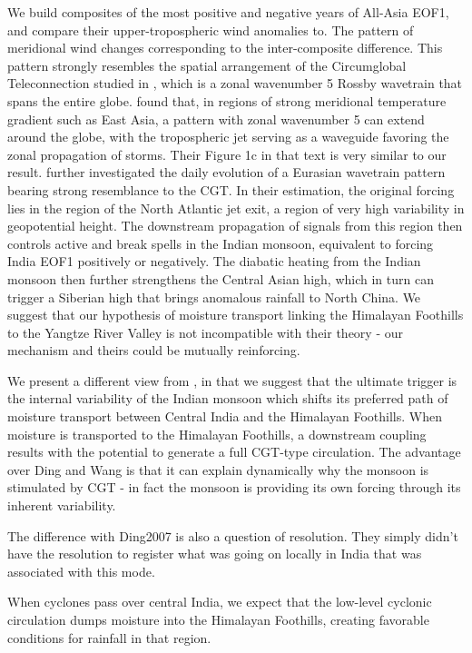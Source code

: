 	We build composites of the most positive and negative years of All-Asia EOF1, and compare their upper-tropospheric wind anomalies to. The pattern of meridional wind changes corresponding to the inter-composite difference. This pattern strongly resembles the spatial arrangement of the Circumglobal Teleconnection studied in \citet{Ding2005a}, which is a zonal wavenumber 5 Rossby wavetrain that spans the entire globe. \citet{Branstator2002} found that, in regions of strong meridional temperature gradient such as East Asia, a pattern with zonal wavenumber 5 can extend around the globe, with the tropospheric jet serving as a waveguide favoring the zonal propagation of storms. Their Figure 1c in that text is very similar to our result. \citet{Ding2007} further investigated the daily evolution of a Eurasian wavetrain pattern bearing strong resemblance to the CGT. In their estimation, the original forcing lies in the region of the North Atlantic jet exit, a region of very high variability in geopotential height. The downstream propagation of signals from this region then controls active and break spells in the Indian monsoon, equivalent to forcing India EOF1 positively or negatively. The diabatic heating from the Indian monsoon then further strengthens the Central Asian high, which in turn can trigger a Siberian high that brings anomalous rainfall to North China. We suggest that our hypothesis of moisture transport linking the Himalayan Foothills to the Yangtze River Valley \citep{Day2015} is not incompatible with their theory - our mechanism and theirs could be mutually reinforcing.
	
	We present a different view from \citet{Ding2007}, in that we suggest that the ultimate trigger is the internal variability of the Indian monsoon which shifts its preferred path of moisture transport between Central India and the Himalayan Foothills. When moisture is transported to the Himalayan Foothills, a downstream coupling results with the potential to generate a full CGT-type circulation. The advantage over Ding and Wang is that it can explain dynamically why the monsoon is stimulated by CGT - in fact the monsoon is providing its own forcing through its inherent variability. 
	
	The difference with Ding2007 is also a question of resolution. They simply didn't have the resolution to register what was going on locally in India that was associated with this mode.
	
	When cyclones pass over central India, we expect that the low-level cyclonic circulation dumps moisture into the Himalayan Foothills, creating favorable conditions for rainfall in that region.

